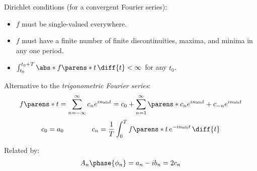 \begin{multicols}{2}
\begin{CheatsheetEntryFrame}
        Dirichlet conditions (for a convergent Fourier series):
        \begin{itemize}
            \item $f$ must be single-valued everywhere.
            \item $f$ must have a finite number of finite discontinuities, maxima, and minima in any one period.
            \item $\int_{t_0}^{t_0+T} \abs*{f\parens*{t}} \,\diff{t} < \infty$ for any $t_0$.
        \end{itemize}

    \end{CheatsheetEntryFrame}

    \begin{CheatsheetEntryFrame}


        Alternative to the \emph{trigonometric Fourier series}:
        \begin{equation*}
            f\parens*{t}
            = \sum_{n = -\infty}^\infty c_n e^{i n \omega_0 t}
            = c_0 + \sum_{n = 1}^\infty \parens*{
                c_n e^{i n \omega_0 t} + c_{-n} e^{i n \omega_0 t}
            }
        \end{equation*}
        \begin{equation*}
            c_0 = a_0
            \qquad\qquad
            c_n = \frac{1}{T} \int_0^T f\parens*{t} \, e^{-i n \omega_0 t} \,\diff{t}
        \end{equation*}

        Related by:
        \begin{gather*}
            A_n \phase{\phi_n} = a_n - i b_n = 2 c_n
        \end{gather*}

    \end{CheatsheetEntryFrame}

    \begin{CheatsheetEntryFrame}


\end{CheatsheetEntryFrame}
\end{multicols}
